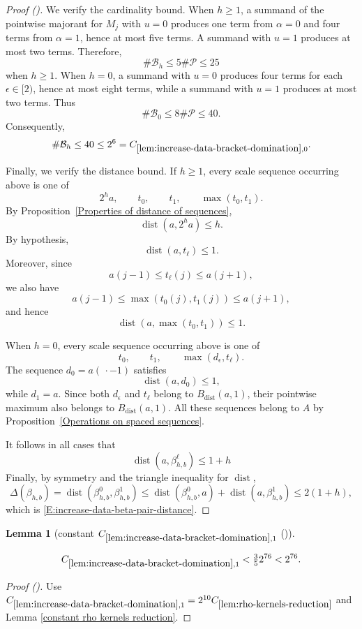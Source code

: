 \documentclass[12pt,reqno]{amsart}
\newcommand{\auto}{{({\tiny\faCar})}}
\theoremstyle{plain}
\newtheorem{lemma}[theorem]{Lemma}
\numberwithin{equation}{section}
\theoremstyle{remark}
\newcommand{\uses}[1]{}
\newcommand{\usesdefs}[1]{}
\newcommand{\leanok}{}
\newcommand{\lean}[1]{}
\DeclareMathOperator{\dist}{dist}
\begin{document}
\begin{proof}[Proof \auto]
We verify the cardinality bound. When \(h\geq1\), a summand of the
pointwise majorant for \(M_j\) with \(u=0\) produces one term from
\(\alpha=0\) and four terms from \(\alpha=1\), hence at most five
terms. A summand with \(u=1\) produces at most two terms. Therefore,
\[
\#\mathcal B_h
\leq
5\#\mathcal P
\leq
25
\]
when \(h\geq1\). When \(h=0\), a summand with \(u=0\) produces four
terms for each \(\epsilon\in[2)\), hence at most eight terms, while
a summand with \(u=1\) produces at most two terms. Thus
\[
\#\mathcal B_0
\leq
8\#\mathcal P
\leq
40.
\]
Consequently,
\[
\#\mathcal B_h
\leq
40
\leq
2^6
=
C_{\ref{lem:increase-data-bracket-domination},0}.
\]

Finally, we verify the distance bound. If \(h\geq1\), every scale
sequence occurring above is one of
\[
2^ha,\qquad
t_0,\qquad
t_1,\qquad
\max(t_0,t_1).
\]
By Proposition~\ref{Properties of distance of sequences},
\[
\dist(a,2^ha)\leq h.
\]
By hypothesis,
\[
\dist(a,t_\ell)\leq1.
\]
Moreover, since
\[
a(j-1)\leq t_\ell(j)\leq a(j+1),
\]
we also have
\[
a(j-1)
\leq
\max(t_0(j),t_1(j))
\leq
a(j+1),
\]
and hence
\[
\dist(a,\max(t_0,t_1))\leq1.
\]

When \(h=0\), every scale sequence occurring above is one of
\[
t_0,\qquad
t_1,\qquad
\max(d_\epsilon,t_\ell).
\]
The sequence \(d_0=a(\,\cdot-1)\) satisfies
\[
\dist(a,d_0)\leq1,
\]
while \(d_1=a\). Since both \(d_\epsilon\) and \(t_\ell\) belong to
\(B_{\dist}(a,1)\), their pointwise maximum also belongs to
\(B_{\dist}(a,1)\). All these sequences belong to \(A\) by
Proposition~\ref{Operations on spaced sequences}.

It follows in all cases that
\[
\dist(a,\beta_{h,b}^\ell)
\leq
1+h
\]
Finally, by symmetry and the triangle inequality for \(\dist\),
\[
\Delta(\beta_{h,b}) = \dist(\beta_{h,b}^0,\beta_{h,b}^1) \leq \dist(\beta_{h,b}^0,a) + \dist(a,\beta_{h,b}^1) \leq 2(1+h),
\]
which is
\eqref{E:increase-data-beta-pair-distance}.
\end{proof}

\begin{lemma}[constant $C_{\ref{lem:increase-data-bracket-domination},1}$ \auto]\label{constant increase data bracket domination}\uses{lem:increase-data-bracket-domination,lem:rho-kernels-reduction,constant rho kernels reduction}\usesdefs{}
\lean{Auto.constantIncreaseDataBracketDomination}
\leanok
\begin{equation}\label{constant increase data bracket domination bound}
C_{\ref{lem:increase-data-bracket-domination},1}
<\tfrac35 2^{76}<2^{76}.
\end{equation}
\end{lemma}
\begin{proof}[Proof \auto]
Use $C_{\ref{lem:increase-data-bracket-domination},1}=2^{10}C_{\ref{lem:rho-kernels-reduction}}$ and Lemma \ref{constant rho kernels reduction}.
\end{proof}
\end{document}
